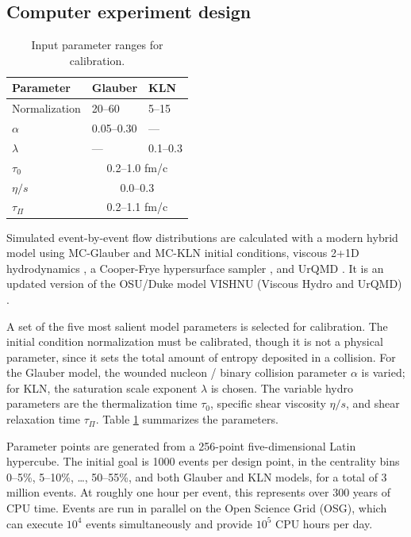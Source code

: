 \documentclass[reprint,amsmath]{revtex4-1}
\begin{document}
\subsection{Computer experiment design}

\begin{table}[b]
  \centering
  \begin{ruledtabular}
  \begin{tabular}{lll}
    Parameter & Glauber & KLN \\
    \hline
    Normalization & 20--60 & 5--15 \\
    $\alpha$ & 0.05--0.30 & --- \\
    $\lambda$ & --- & 0.1--0.3 \\
    $\tau_0$ & \multicolumn{2}{c}{0.2--1.0 fm/c} \\
    $\eta/s$ & \multicolumn{2}{c}{0.0--0.3} \\
    $\tau_\Pi$ & \multicolumn{2}{c}{0.2--1.1 fm/c} \\
  \end{tabular}
  \end{ruledtabular}
  \caption{Input parameter ranges for calibration.}
  \label{tab:params}
\end{table}

Simulated event-by-event flow distributions are calculated with a modern hybrid model using MC-Glauber
\cite{glauber} and MC-KLN \cite{kln} initial conditions, viscous 2+1D hydrodynamics \cite{vish}, a Cooper-Frye
hypersurface sampler \cite{iss}, and UrQMD \cite{urqmd1,urqmd2}.  It is an updated version of the OSU/Duke model VISHNU (Viscous Hydro and
UrQMD) \cite{song}.

A set of the five most salient model parameters is selected for calibration.  The initial condition normalization must be calibrated, though
it is not a physical parameter, since it sets the total amount of entropy deposited in a collision.  For the Glauber model, the wounded
nucleon / binary collision parameter $\alpha$ is varied; for KLN, the saturation scale exponent $\lambda$ is chosen.  The variable hydro
parameters are the thermalization time $\tau_0$, specific shear viscosity $\eta/s$, and shear relaxation time $\tau_\Pi$.  Table
\ref{tab:params} summarizes the parameters.

Parameter points are generated from a 256-point five-dimensional Latin hypercube.  The initial goal is 1000 events per design point, in the
centrality bins 0--5\%, 5--10\%, \ldots, 50--55\%, and both Glauber and KLN models, for a total of 3 million events.  At roughly one hour
per event, this represents over 300 years of CPU time.  Events are run in parallel on the Open Science Grid (OSG), which can execute $10^4$
events simultaneously and provide $10^5$ CPU hours per day.
\end{document}
